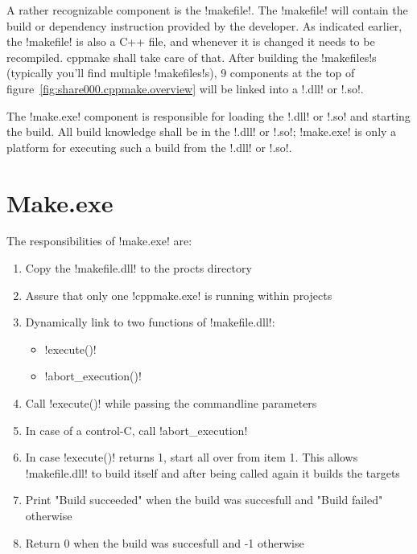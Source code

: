 A rather recognizable component is the !makefile!. The !makefile! will contain the
build or dependency instruction provided by the developer. As indicated earlier,
the !makefile! is also a C++ file, and whenever it is changed it needs to be 
recompiled. cppmake shall take care of that. After building the !makefiles!s 
(typically you'll find multiple !makefiles!s), 9 components at the top of
figure~\ref{fig:share000.cppmake.overview} will be linked into a !.dll! or !.so!.

The !make.exe! component is responsible for loading the !.dll! or !.so! and starting
the build. All build knowledge shall be in the !.dll! or !.so!; !make.exe! is only
a platform for executing such a build from the !.dll! or !.so!.

\section{Make.exe}
\label{sec:share000.cppmake.make.exe}

The responsibilities of !make.exe! are: 

\begin{enumerate}
\item Copy the !makefile.dll! to the procts directory
\item Assure that only one !cppmake.exe! is running within projects
\item Dynamically link to two functions of !makefile.dll!:
\begin{itemize}
   \item !execute()!
   \item !abort_execution()!
\end{itemize}
\item Call !execute()! while passing the commandline parameters 
\item In case of a control-C, call !abort_execution!
\item In case !execute()! returns 1, start all over from item 1.
    This allows !makefile.dll! to build itself and after being called again it builds the targets
\item Print "Build succeeded" when the build was succesfull and "Build failed" otherwise
\item Return 0 when the build was succesfull and -1 otherwise
\end{enumerate}

